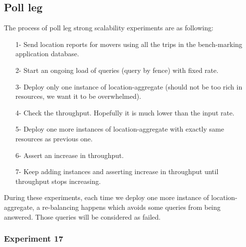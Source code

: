 \documentclass[a4]{report}
\begin{document}
        \subsection{Poll leg}
        The process of poll leg strong scalability experiments are as following:
        \begin{itemize}
            \item[1-] Send location reports for movers using all the trips in the bench-marking application database.
            \item[2-] Start an ongoing load of queries (query by fence) with fixed rate.
            \item[3-] Deploy only one instance of location-aggregate (should not be too rich in resources, we want it to be
            overwhelmed).
            \item[4-] Check the throughput. Hopefully it is much lower than the input rate.
            \item[5-] Deploy one more instances of location-aggregate with exactly same resources as previous one.
            \item[6-] Assert an increase in throughput.
            \item[7-] Keep adding instances and asserting increase in throughput until throughput stops increasing.
        \end{itemize}

        During these experiments, each time we deploy one more instance of location-aggregate, a re-balancing happens which
        avoids some queries from being answered.
        Those queries will be considered as failed.

        \clearpage

        \subsubsection{Experiment 17}
\end{document}
